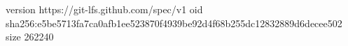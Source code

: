 version https://git-lfs.github.com/spec/v1
oid sha256:e5be5713fa7ca0afb1ee523870f4939be92d4f68b255dc12832889d6decee502
size 262240
